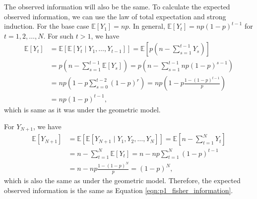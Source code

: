 \documentclass[letterpaper,11pt]{article}
\begin{document}
\begin{enumerate}
\begin{enumerate}
\begin{description}
        The observed information will also be the same. To calculate the
        expected observed information, we can use the law of total expectation
        and strong induction. For the base case
        $\mathbb{E}\left[Y_1\right] = np$. In general,
        $\mathbb{E}\left[Y_t\right] = np\left(1 - p\right)^{t-1}$ for
        $t = 1,2,\ldots,N$. For such $t > 1$, we have
        \begin{align}
          \mathbb{E}\left[Y_t\right]
          &=  
            \mathbb{E}\left[\mathbb{E}\left[Y_t \mid Y_1,\ldots,Y_{t-1}\right]\right]
          =
            \mathbb{E}\left[
            p\left(n - \sum_{s=1}^{t-1}Y_s\right)
            \right] \nonumber\\
          &= p\left(n - \sum_{s=1}^{t-1}\mathbb{E}\left[Y_s\right]\right)
          =
            p\left(n - \sum_{s=1}^{t-1} np\left(1 - p\right)^{s-1}\right)
            \nonumber\\
          &= np\left(1 - p\sum_{s=0}^{t-2}\left(1 - p\right)^r\right)
            = np\left(
            1 - p\frac{1 - \left(1 - p\right)^{t - 1}}{p}\right)
          \nonumber\\
          &= np\left(1 - p\right)^{t-1},
            \label{eqn:p3_yt_mean}
        \end{align}
        which is same as it was under the geometric model.
        
        For $Y_{N+1}$, we have
        \begin{align}
          \mathbb{E}\left[Y_{N+1}\right]
          &= \mathbb{E}\left[
            \mathbb{E}\left[Y_{N+1} \mid Y_1,Y_2,\ldots,Y_N\right]\right]
          = \mathbb{E}\left[
          n - \sum_{t=1}^{N} Y_t
          \right]
          \nonumber\\
          &= n - \sum_{t=1}^{N} \mathbb{E}\left[Y_t\right]
            = n - np\sum_{t=1}^N\left(1 - p\right)^{t-1} \nonumber\\
          &= n - np \frac{1 - \left(1 - p\right)^N}{p} = \left(1 - p\right)^N,
            \label{eqn:p3_yn1_mean}
        \end{align}
        which is also the same as under the geometric model. Therefore, the
        expected observed information is the same as Equation
        \ref{eqn:p1_fisher_information}.


\end{description}
\end{enumerate}
\end{enumerate}
\end{document}
